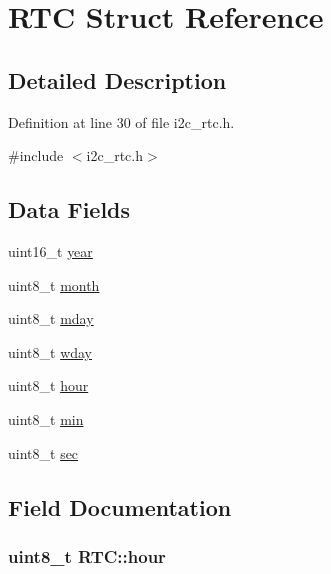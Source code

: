 \hypertarget{structRTC}{\section{R\-T\-C Struct Reference}
\label{structRTC}
}


\subsection{Detailed Description}


Definition at line 30 of file i2c\-\_\-rtc.\-h.



{\ttfamily \#include $<$i2c\-\_\-rtc.\-h$>$}

\subsection*{Data Fields}
\begin{DoxyCompactItemize}
\item 
uint16\-\_\-t \hyperlink{structRTC_a94d8ae49bff6a2df2b9ff8e390f57dc7}{year}
\item 
uint8\-\_\-t \hyperlink{structRTC_ab3edfa995dc98159d1ecaa5e7cb9fb8e}{month}
\item 
uint8\-\_\-t \hyperlink{structRTC_a8572937f310a4d7de1b5229d05c1c5af}{mday}
\item 
uint8\-\_\-t \hyperlink{structRTC_ab3b1c5e52d95f4c763cdbfe7316ab6a9}{wday}
\item 
uint8\-\_\-t \hyperlink{structRTC_a8b260c2cb19dae2065886118760c4ed3}{hour}
\item 
uint8\-\_\-t \hyperlink{structRTC_a09bf7e86654a65b51df00b38e22b8044}{min}
\item 
uint8\-\_\-t \hyperlink{structRTC_a224a3d103a21f1e60b042e7a7a76c882}{sec}
\end{DoxyCompactItemize}


\subsection{Field Documentation}
\hypertarget{structRTC_a8b260c2cb19dae2065886118760c4ed3}{
\subsubsection[{hour}]{\setlength{\rightskip}{0pt plus 5cm}uint8\-\_\-t R\-T\-C\-::hour}}\label{structRTC_a8b260c2cb19dae2065886118760c4ed3}


